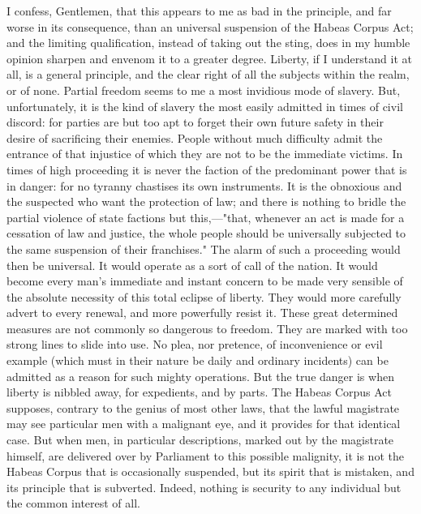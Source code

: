 I confess, Gentlemen, that this appears to me as bad in the principle, and far worse in its consequence, than an universal suspension of the Habeas Corpus Act; and the limiting qualification, instead of taking out the sting, does in my humble opinion sharpen and envenom it to a greater degree. Liberty, if I understand it at all, is a general principle, and the clear right of all the subjects within the realm, or of none. Partial freedom seems to me a most invidious mode of slavery. But, unfortunately, it is the kind of slavery the most easily admitted in times of civil discord: for parties are but too apt to forget their own future safety in their desire of sacrificing their enemies. People without much difficulty admit the entrance of that injustice of which they are not to be the immediate victims. In times of high proceeding it is never the faction of the predominant power that is in danger: for no tyranny chastises its own instruments. It is the obnoxious and the suspected who want the protection of law; and there is nothing to bridle the partial violence of state factions but this,—"that, whenever an act is made for a cessation of law and justice, the whole people should be universally subjected to the same suspension of their franchises." The alarm of such a proceeding would then be universal. It would operate as a sort of call of the nation. It would become every man's immediate and instant concern to be made very sensible of the absolute necessity of this total eclipse of liberty. They would more carefully advert to every renewal, and more powerfully resist it. These great determined measures are not commonly so dangerous to freedom. They are marked with too strong lines to slide into use. No plea, nor pretence, of inconvenience or evil example (which must in their nature be daily and ordinary incidents) can be admitted as a reason for such mighty operations. But the true danger is when liberty is nibbled away, for expedients, and by parts. The Habeas Corpus Act supposes, contrary to the genius of most other laws, that the lawful magistrate may see particular men with a malignant eye, and it provides for that identical case. But when men, in particular descriptions, marked out by the magistrate himself, are delivered over by Parliament to this possible malignity, it is not the Habeas Corpus that is occasionally suspended, but its spirit that is mistaken, and its principle that is subverted. Indeed, nothing is security to any individual but the common interest of all.

